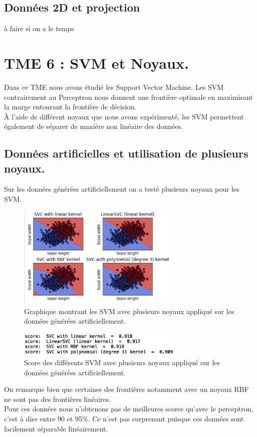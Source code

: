 \documentclass{article}
\begin{document}
\subsection{Données 2D et projection}
à faire si on a le temps

\section{TME 6 : SVM et Noyaux.}
Dans ce TME nous avons étudié les Support Vector Machine. Les SVM contrairement au Perceptron nous donnent une frontière optimale en maximisant la marge entourant la frontière de décision.\\À l'aide de différent noyaux que nous avons expérimenté, les SVM permettent également de séparer de manière non linéaire des données.\\
\subsection{Données artificielles et utilisation de plusieurs noyaux.}
Sur les données générées artificiellement on a testé plusieurs noyaux pour les SVM.
\begin{figure}[h]
	\center
	\includegraphics[width=8cm]{figure/tme6/svmarti.png} 
	 \caption{Graphique montrant les SVM avec plusieurs noyaux appliqué sur les données générées artificiellement.  }
	 
\end{figure}
\begin{figure}[h]
	\center
	\includegraphics[width=8cm]{figure/tme6/score.png} 
	 \caption{Score des différents SVM avec plusieurs noyaux appliqué sur les données générées artificiellement. }
	 
\end{figure}
On remarque bien que certaines des frontières notamment avec un noyaux RBF ne sont pas des frontières linéaires.\\
Pour ces données nous n'obtenons pas de meilleures scores qu'avec le perceptron, c'est à dire entre 90 et 95\%. Ce n'est pas surprenant puisque ces données sont facilement séparable linéairement.
\clearpage
\end{document}
